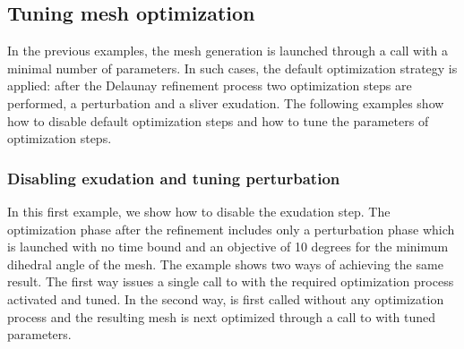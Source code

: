 



\subsection{Tuning mesh optimization}
\label{Mesh_3_subsection_examples_optimization}

In the previous examples, the mesh generation is launched through a  call
 with a minimal number of parameters. In such cases, 
the default optimization strategy is applied: after the Delaunay refinement process
 two optimization steps are performed, a perturbation and  a sliver exudation.
The following examples show how to disable default optimization steps 
and how to tune the parameters of optimization steps.



\subsubsection{Disabling exudation and tuning perturbation}

In this first example, we show how to disable the exudation step.
The optimization phase after the refinement includes only
a perturbation phase which is launched  with no time bound
and an objective of 10 degrees for the minimum dihedral angle
of the mesh.
The example shows two ways of achieving the same result. The first way
issues a single call to  with the required optimization 
process activated and tuned. In the second way,  is first called
without any optimization process and the resulting mesh is next optimized
through a call to  with tuned parameters.


